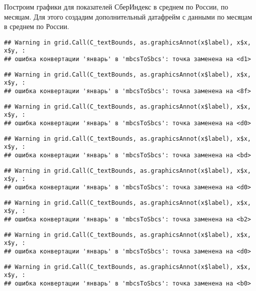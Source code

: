 \documentclass[
]{article}
\begin{document}
Построим графики для показателей СберИндекс в среднем по России, по
месяцам. Для этого создадим дополнительный датафрейм с данными по
месяцам в среднем по России.

\begin{verbatim}
## Warning in grid.Call(C_textBounds, as.graphicsAnnot(x$label), x$x, x$y, :
## ошибка конвертации 'январь' в 'mbcsToSbcs': точка заменена на <d1>
\end{verbatim}

\begin{verbatim}
## Warning in grid.Call(C_textBounds, as.graphicsAnnot(x$label), x$x, x$y, :
## ошибка конвертации 'январь' в 'mbcsToSbcs': точка заменена на <8f>
\end{verbatim}

\begin{verbatim}
## Warning in grid.Call(C_textBounds, as.graphicsAnnot(x$label), x$x, x$y, :
## ошибка конвертации 'январь' в 'mbcsToSbcs': точка заменена на <d0>
\end{verbatim}

\begin{verbatim}
## Warning in grid.Call(C_textBounds, as.graphicsAnnot(x$label), x$x, x$y, :
## ошибка конвертации 'январь' в 'mbcsToSbcs': точка заменена на <bd>
\end{verbatim}

\begin{verbatim}
## Warning in grid.Call(C_textBounds, as.graphicsAnnot(x$label), x$x, x$y, :
## ошибка конвертации 'январь' в 'mbcsToSbcs': точка заменена на <d0>
\end{verbatim}

\begin{verbatim}
## Warning in grid.Call(C_textBounds, as.graphicsAnnot(x$label), x$x, x$y, :
## ошибка конвертации 'январь' в 'mbcsToSbcs': точка заменена на <b2>
\end{verbatim}

\begin{verbatim}
## Warning in grid.Call(C_textBounds, as.graphicsAnnot(x$label), x$x, x$y, :
## ошибка конвертации 'январь' в 'mbcsToSbcs': точка заменена на <d0>
\end{verbatim}

\begin{verbatim}
## Warning in grid.Call(C_textBounds, as.graphicsAnnot(x$label), x$x, x$y, :
## ошибка конвертации 'январь' в 'mbcsToSbcs': точка заменена на <b0>
\end{verbatim}
\end{document}
